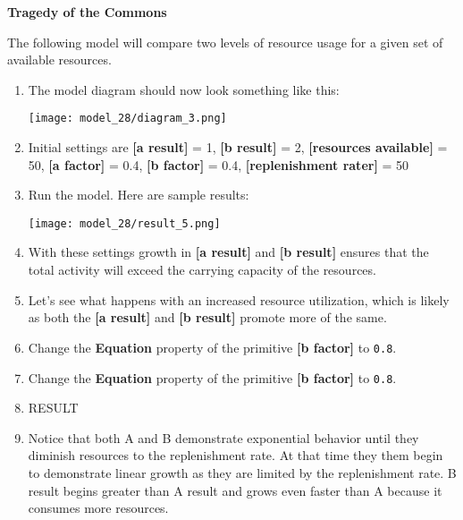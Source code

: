 \documentclass[]{memoir}
\makeatletter
\def\maxwidth{\ifdim\Gin@nat@width>\linewidth\linewidth
\else\Gin@nat@width\fi}
\let\Oldincludegraphics\includegraphics
\renewcommand{\includegraphics}[1]{\Oldincludegraphics[width=\maxwidth]{#1}}
\newcommand{\p}[1]{\textbf{{[}#1{]}}}
\newcommand{\e}[1]{\texttt{#1}}
\renewcommand{\a}[1]{\textbf{#1}}
\makeatother
\begin{document}
\begin{oframed}\textbf{Tragedy of the Commons} 

 The following model will compare two levels of resource usage for a given set of available resources.

\begin{enumerate}
\item The model diagram should now look something like this: \par \begin{minipage}{\linewidth}  \centering \texttt{[image: model\_28/diagram\_3.png]}
\end{minipage}
\item 

Initial settings are \p{a result} = 1, \p{b result} = 2, \p{resources available} = 50, \p{a factor} = 0.4, \p{b factor} = 0.4, \p{replenishment rater} = 50


\item Run the model. Here are sample results:\par \begin{minipage}{\linewidth}  \centering \texttt{[image: model\_28/result\_5.png]}
\end{minipage}
\item 

With these settings growth in \p{a result} and \p{b result} ensures that the total activity will exceed the carrying capacity of the resources.


\item 

Let's see what happens with an increased resource utilization, which is likely as both the \p{a result} and \p{b result} promote more of the same.


\item  Change the \a{Equation} property of the primitive \p{b factor} to \e{0.8}.
\item  Change the \a{Equation} property of the primitive \p{b factor} to \e{0.8}.
\item 

RESULT


\item 

Notice that both A and B demonstrate exponential behavior until they diminish resources to the replenishment rate. At that time they them begin to demonstrate linear growth as they are limited by the replenishment rate. B result begins greater than A result and grows even faster than A because it consumes more resources.



\end{enumerate} \end{oframed}
\end{document}
